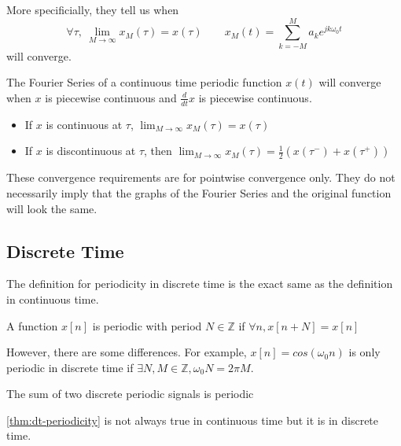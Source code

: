 More specificially, they tell us when
\[
  \forall \tau, \ \lim_{M \rightarrow \infty}{x_M(\tau) = x(\tau)} \qquad x_M(t) = \sum_{k=-M}^{M}{a_k e^{jk\omega_0t}}
\]
will converge.
\begin{theorem}
    The Fourier Series of a continuous time periodic function $x(t)$ will converge when
    $x$ is piecewise continuous and $\frac{d}{dt}x$ is piecewise continuous.
\end{theorem}
\begin{itemize}
	\item If $x$ is continuous at $\tau$, $\lim_{M \rightarrow \infty}x_M(\tau) = x(\tau)$
	\item If $x$ is discontinuous at $\tau$, then $\lim_{M\rightarrow \infty}x_M(\tau) = \frac{1}{2}(x(\tau^-) + x(\tau^+))$ 
\end{itemize}
These convergence requirements are for pointwise convergence only. They do not necessarily imply that the graphs of the Fourier Series
and the original function will look the same.
\subsection{Discrete Time}
The definition for periodicity in discrete time is the exact same as the definition in continuous time.
\begin{definition}
    A function $x[n]$ is periodic with period $N \in \mathbb{Z}$ if $\forall n, x[n+N]=x[n]$
\end{definition}
However, there are some differences. For example, $x[n] = cos(\omega_0 n)$
is only periodic in discrete time if $\exists N, M \in \mathbb{Z}, \omega_0 N = 2 \pi M$.
\begin{theorem}
    The sum of two discrete periodic signals is periodic
	\label{thm:dt-periodicity}
\end{theorem}
\cref{thm:dt-periodicity} is not always true in continuous time but it is in discrete time.

